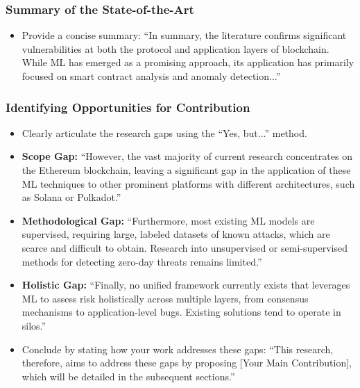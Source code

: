 \subsubsection{Summary of the State-of-the-Art}
\begin{itemize}
	\item Provide a concise summary: ``In summary, the literature confirms significant vulnerabilities at both the protocol and application layers of blockchain. While ML has emerged as a promising approach, its application has primarily focused on smart contract analysis and anomaly detection...''
\end{itemize}
	
\subsubsection{Identifying Opportunities for Contribution}
\begin{itemize}
	\item Clearly articulate the research gaps using the ``Yes, but...'' method.
	\item \textbf{Scope Gap:} ``However, the vast majority of current research concentrates on the Ethereum blockchain, leaving a significant gap in the application of these ML techniques to other prominent platforms with different architectures, such as Solana or Polkadot.''
	\item \textbf{Methodological Gap:} ``Furthermore, most existing ML models are supervised, requiring large, labeled datasets of known attacks, which are scarce and difficult to obtain. Research into unsupervised or semi-supervised methods for detecting zero-day threats remains limited.''
	\item \textbf{Holistic Gap:} ``Finally, no unified framework currently exists that leverages ML to assess risk holistically across multiple layers, from consensus mechanisms to application-level bugs. Existing solutions tend to operate in silos.''
	\item Conclude by stating how your work addresses these gaps: ``This research, therefore, aims to address these gaps by proposing [Your Main Contribution], which will be detailed in the subsequent sections.''
\end{itemize}